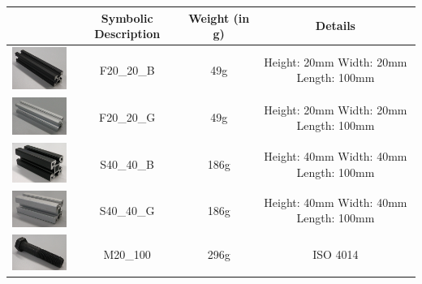 \begin{table}[p]
\begin{tabular}{|c|c|c|c|}
\hline 
 & Symbolic Description & Weight (in g) & Details \\ 
\hline 
\includegraphics[width=3cm]{../images/F20_20_B.jpg} & F20\_20\_B & 49g & Height: 20mm \newline
 Width: 20mm \newline
 Length: 100mm \\ 
\hline 
\includegraphics[width=3cm]{../images/F20_20_G.jpg} & F20\_20\_G & 49g & Height: 20mm \newline
Width: 20mm \newline
Length: 100mm \\ 
\hline 
\includegraphics[width=3cm]{../images/S40_40_B.jpg} & S40\_40\_B & 186g & Height: 40mm \newline
Width: 40mm \newline
Length: 100mm \\ 
\hline 
\includegraphics[width=3cm]{../images/S40_40_G.jpg} & S40\_40\_G & 186g & Height: 40mm \newline
Width: 40mm \newline
Length: 100mm \\ 
\hline 
\includegraphics[width=3cm]{../images/M20_100.jpg} & M20\_100 & 296g & ISO 4014 \newline

\end{tabular}
\end{table}
